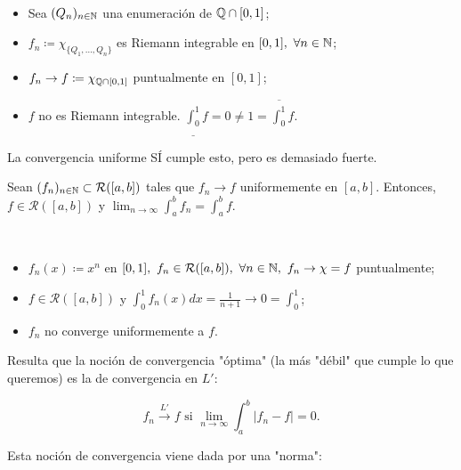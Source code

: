 \documentclass[a4paper]{report}
\begin{document}
	\begin{eg}[2]~
		\begin{itemize}
			\item Sea $(Q_n)_{n \in \mathbb{N}}$ una enumeración de $\mathbb{Q} \cap [0,1]$;

			\item $f_n \coloneq \chi_{\{ Q_1,\dots,Q_n \}}$ es Riemann integrable en $[0,1],\ \forall n \in \mathbb{N}$;

			\item $f_n \to f \coloneq \chi_{\mathbb{Q} \cap [0,1]}$ puntualmente en $[0,1]$;

			\item $f$ no es Riemann integrable. $\underline{\int_{0}^{1}} f = 0 \neq 1 = \overline{\int_{0}^{1}} f$.
		\end{itemize}
	\end{eg}

	\begin{remark}
		La convergencia uniforme SÍ cumple esto, pero es demasiado fuerte.
	\end{remark}

	\begin{ex}[Guía 1]
		Sean $(f_n)_{n \in \mathbb{N}} \subset \mathcal{R}([a,b])$ tales que $f_n \to f$ uniformemente en $[a,b]$. Entonces, $f \in \mathcal{R}([a,b])$ y $\lim_{n \to \infty} \int_{a}^{b} f_n = \int_{a}^{b} f$.
	\end{ex}

	\begin{eg}[3]~
		\begin{itemize}
			\item $f_n (x) \coloneq x^n$ en $[0,1],\ f_n \in \mathcal{R}([a,b]),\ \forall n \in \N,\ f_n \to \chi = f$ puntualmente;

			\item $f \in \mathcal{R}([a,b])$ y $\int_{0}^{1} f_n (x) dx = \frac{1}{n+1} \to 0 = \int_{0}^{1}$;

			\item $f_n$ no converge uniformemente a $f$.
		\end{itemize}
	\end{eg}

	Resulta que la noción de convergencia "óptima" (la más "débil" que cumple lo que queremos) es la de convergencia en $L'$:

	\[
	f_n \xrightarrow{L'} f \text{ si } \lim_{n \to \infty} \int_{a}^{b} | f_n - f | = 0.
	\]

	Esta noción de convergencia viene dada por una "norma":
\end{document}
